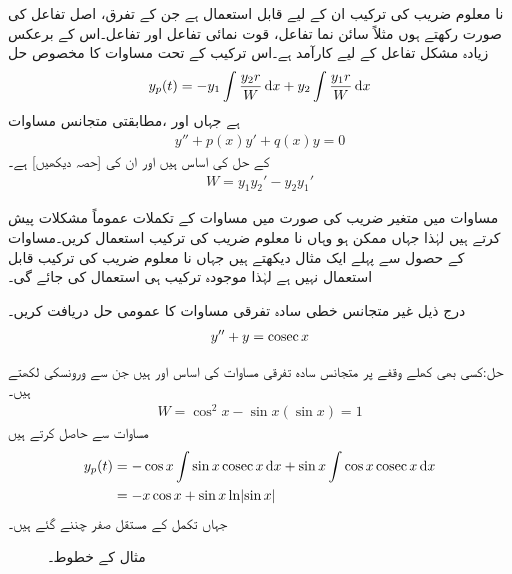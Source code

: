 نا معلوم  ضریب  کی ترکیب ان  کے لیے قابل استعمال ہے جن کے تفرق، اصل تفاعل کی صورت رکھتے ہوں مثلاً سائن نما تفاعل، قوت نمائی  تفاعل اور  تفاعل۔اس کے برعکس  زیادہ مشکل تفاعل کے لیے کارآمد ہے۔اس ترکیب کے تحت مساوات  کا مخصوص حل
\begin{align}\label{مساوات_سادہ_دو_غیر_متجانس_خطی_ب}
y_p(t)=-y_1\int \frac{y_2 r}{W}\dif x+y_2\int \frac{y_1 r}{W}\dif x
\end{align}
ہے جہاں  اور  ،مطابقتی متجانس مساوات
\begin{align}\label{مساوات_سادہ_دو_غیر_متجانس_خطی_پ}
y''+p(x)y'+q(x)y=0
\end{align}
 کے حل کی اساس ہیں اور  ان کی  [حصہ  دیکھیں] ہے۔
\begin{align}\label{مساوات_سادہ_دو_غیر_متجانس_خطی_ت}
W=y_1y_2'-y_2y_1'
\end{align}

مساوات  میں متغیر  ضریب  کی صورت میں مساوات  کے تکملات عموماً مشکلات  پیش کرتے ہیں لہٰذا جہاں ممکن ہو وہاں نا معلوم  ضریب  کی ترکیب استعمال کریں۔مساوات  کے حصول سے پہلے ایک مثال دیکھتے ہیں جہاں نا معلوم  ضریب  کی ترکیب قابل استعمال نہیں ہے لہٰذا موجودہ ترکیب ہی استعمال کی جائے گی۔

درج ذیل غیر متجانس خطی سادہ تفرقی مساوات کا عمومی حل دریافت کریں۔
\begin{align*}
y''+y=\operatorname{cosec} x
\end{align*}

حل:کسی بھی کھلے وقفے پر متجانس سادہ تفرقی مساوات کی اساس  اور  ہیں جن سے ورونسکی لکھتے ہیں۔
\begin{align*}
W=\cos^2 x-\sin x(\sin x)=1
\end{align*} 
مساوات  سے  حاصل کرتے ہیں
\begin{gather}
\begin{aligned}\label{مساوات_سادہ_دو_مثال_متعین_متغیرات_تبدیلی}
y_p(t)&=-\cos x\int \sin x \cosec x\dif x+\sin x\int \cos x \cosec x\dif x\\
&=-x\cos x+\sin x\ln\abs{\sin x}
\end{aligned}
\end{gather}
جہاں تکمل کے مستقل صفر چننے گئے ہیں۔
\begin{figure}
\centering
{}
\caption{مثال  کے خطوط۔}
\label{شکل_مثال_سادہ_دو_متعین_متغیرات_تبدیلی}
\end{figure}

